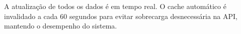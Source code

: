 \documentclass[a4paper,12pt]{article}
\begin{document}






A atualização de todos os dados é em tempo real. O cache automático é invalidado a cada 60 segundos para evitar sobrecarga desnecessária na API, mantendo o desempenho do sistema.
\end{document}

